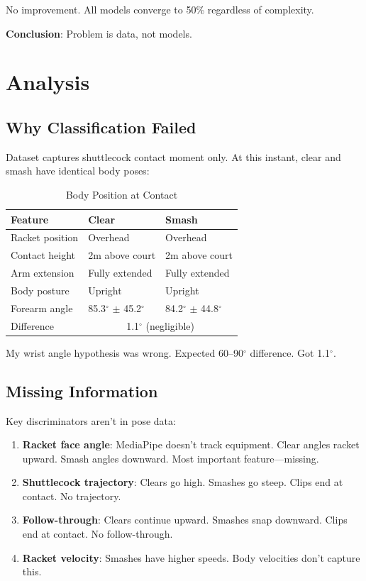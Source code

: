 \documentclass[11pt,a4paper]{article}
\begin{document}
No improvement. All models converge to 50\% regardless of complexity.

\textbf{Conclusion}: Problem is data, not models.

\section{Analysis}

\subsection{Why Classification Failed}

Dataset captures shuttlecock contact moment only. At this instant, clear and smash have identical body poses:

\begin{table}[H]
\centering
\caption{Body Position at Contact}
\begin{tabular}{lll}
\toprule
Feature & Clear & Smash \\
\midrule
Racket position & Overhead & Overhead \\
Contact height & 2m above court & 2m above court \\
Arm extension & Fully extended & Fully extended \\
Body posture & Upright & Upright \\
Forearm angle & 85.3$^\circ$ $\pm$ 45.2$^\circ$ & 84.2$^\circ$ $\pm$ 44.8$^\circ$ \\
\midrule
Difference & \multicolumn{2}{c}{1.1$^\circ$ (negligible)} \\
\bottomrule
\end{tabular}
\end{table}

My wrist angle hypothesis was wrong. Expected 60--90$^\circ$ difference. Got 1.1$^\circ$.

\subsection{Missing Information}

Key discriminators aren't in pose data:

\begin{enumerate}
\item \textbf{Racket face angle}: MediaPipe doesn't track equipment. Clear angles racket upward. Smash angles downward. Most important feature---missing.
\item \textbf{Shuttlecock trajectory}: Clears go high. Smashes go steep. Clips end at contact. No trajectory.
\item \textbf{Follow-through}: Clears continue upward. Smashes snap downward. Clips end at contact. No follow-through.
\item \textbf{Racket velocity}: Smashes have higher speeds. Body velocities don't capture this.
\end{enumerate}
\end{document}
